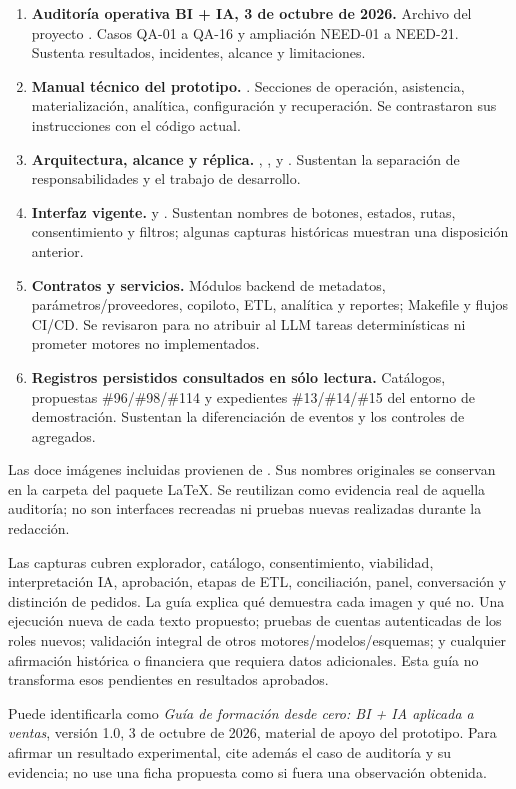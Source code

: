 \begin{enumerate}[label=R\arabic*.]
\item \textbf{Auditoría operativa BI + IA, 3 de octubre de 2026.} Archivo del proyecto . Casos QA-01 a QA-16 y ampliación NEED-01 a NEED-21. Sustenta resultados, incidentes, alcance y limitaciones.
\item \textbf{Manual técnico del prototipo.} . Secciones de operación, asistencia, materialización, analítica, configuración y recuperación. Se contrastaron sus instrucciones con el código actual.
\item \textbf{Arquitectura, alcance y réplica.} , ,  y . Sustentan la separación de responsabilidades y el trabajo de desarrollo.
\item \textbf{Interfaz vigente.}  y . Sustentan nombres de botones, estados, rutas, consentimiento y filtros; algunas capturas históricas muestran una disposición anterior.
\item \textbf{Contratos y servicios.} Módulos backend de metadatos, parámetros/proveedores, copiloto, ETL, analítica y reportes; Makefile y flujos CI/CD. Se revisaron para no atribuir al LLM tareas determinísticas ni prometer motores no implementados.
\item \textbf{Registros persistidos consultados en sólo lectura.} Catálogos, propuestas \#96/\#98/\#114 y expedientes \#13/\#14/\#15 del entorno de demostración. Sustentan la diferenciación de eventos y los controles de agregados.
\end{enumerate}
Las doce imágenes incluidas provienen de . Sus nombres originales se conservan en la carpeta  del paquete LaTeX. Se reutilizan como evidencia real de aquella auditoría; no son interfaces recreadas ni pruebas nuevas realizadas durante la redacción.

Las capturas cubren explorador, catálogo, consentimiento, viabilidad, interpretación IA, aprobación, etapas de ETL, conciliación, panel, conversación y distinción de pedidos. La guía explica qué demuestra cada imagen y qué no.
Una ejecución nueva de cada texto propuesto; pruebas de cuentas autenticadas de los roles nuevos; validación integral de otros motores/modelos/esquemas; y cualquier afirmación histórica o financiera que requiera datos adicionales. Esta guía no transforma esos pendientes en resultados aprobados.
\begin{good}
Puede identificarla como \emph{Guía de formación desde cero: BI + IA aplicada a ventas}, versión 1.0, 3 de octubre de 2026, material de apoyo del prototipo. Para afirmar un resultado experimental, cite además el caso de auditoría y su evidencia; no use una ficha propuesta como si fuera una observación obtenida.
\end{good}
